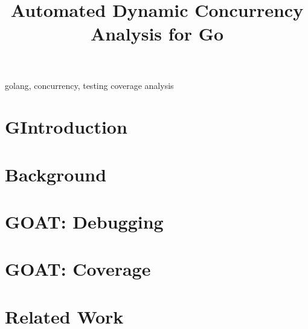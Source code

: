 \documentclass[conference]{IEEEtran}
\begin{document}
\title{Automated Dynamic Concurrency Analysis for Go}


\author{
\and
{}
}

\maketitle

\begin{abstract}

\end{abstract}

\begin{IEEEkeywords}
golang, concurrency, testing coverage analysis
\end{IEEEkeywords}

\section{GIntroduction}
\label{sec:Gintro}


\section{Background}
\label{sec:bg}


\section{GOAT: Debugging}
\label{sec:design}



\section{GOAT: Coverage}
\label{sec:coverage}


\section{Related Work}
\label{sec:related}







\end{document}

